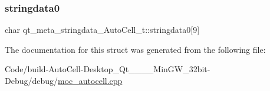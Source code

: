 \subsubsection{\texorpdfstring{stringdata0}{stringdata0}}
{\footnotesize\ttfamily char qt\+\_\+meta\+\_\+stringdata\+\_\+\+Auto\+Cell\+\_\+t\+::stringdata0\mbox{[}9\mbox{]}}



The documentation for this struct was generated from the following file\+:\begin{DoxyCompactItemize}
\item 
Code/build-\/\+Auto\+Cell-\/\+Desktop\+\_\+\+Qt\+\_\+\_\+\_\+\_\+\+Min\+G\+W\+\_\+32bit-\/\+Debug/debug/\mbox{\hyperlink{moc__autocell_8cpp}{moc\+\_\+autocell.\+cpp}}\end{DoxyCompactItemize}
